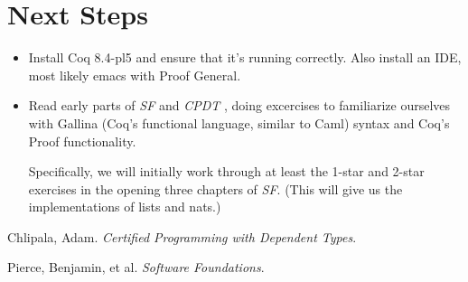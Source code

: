 \documentclass{article}
\begin{document}
\section{Next Steps}
\begin{itemize}
  \item
    Install Coq 8.4-pl5 and ensure that it's running correctly.
    Also install an IDE, most likely emacs with Proof General.
  \item
    Read early parts of \emph{SF} \cite{sf} and \emph{CPDT} \cite{cpdt},
    doing excercises to familiarize ourselves with Gallina (Coq's functional
    language, similar to Caml) syntax and Coq's Proof functionality.

    Specifically, we will initially work through at least the 1-star and
    2-star exercises in the opening three chapters of \emph{SF}.
    (This will give us the implementations of lists and nats.)
\end{itemize}

\begin{thebibliography}{xx}
    Chlipala, Adam. \emph{Certified Programming with Dependent Types}.

    Pierce, Benjamin, et al. \emph{Software Foundations}.
\end{thebibliography}
\end{document}
